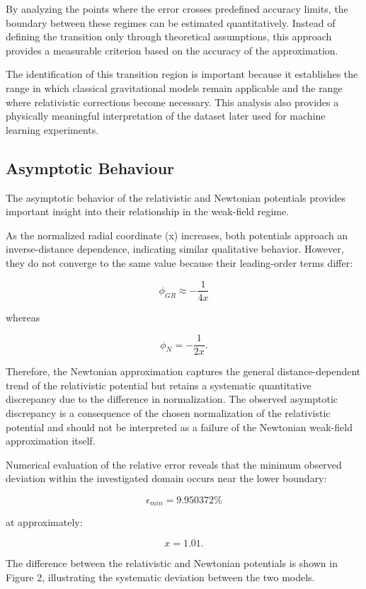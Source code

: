 \documentclass[
]{article}
\begin{document}
By analyzing the points where the error crosses predefined accuracy
limits, the boundary between these regimes can be estimated
quantitatively. Instead of defining the transition only through
theoretical assumptions, this approach provides a measurable criterion
based on the accuracy of the approximation.

The identification of this transition region is important because it
establishes the range in which classical gravitational models remain
applicable and the range where relativistic corrections become
necessary. This analysis also provides a physically meaningful
interpretation of the dataset later used for machine learning
experiments.

\subsection{Asymptotic Behaviour}\label{asymptotic-behaviour}

The asymptotic behavior of the relativistic and Newtonian potentials
provides important insight into their relationship in the weak-field
regime.

As the normalized radial coordinate (x) increases, both potentials
approach an inverse-distance dependence, indicating similar qualitative
behavior. However, they do not converge to the same value because their
leading-order terms differ:

\[
\phi_{GR}\approx-\frac{1}{4x}
\]

whereas

\[
\phi_N=-\frac{1}{2x}.
\]

Therefore, the Newtonian approximation captures the general
distance-dependent trend of the relativistic potential but retains a
systematic quantitative discrepancy due to the difference in
normalization.
The observed asymptotic discrepancy is a consequence of the chosen
normalization of the relativistic potential and should not be interpreted
as a failure of the Newtonian weak-field approximation itself.

Numerical evaluation of the relative error reveals that the minimum
observed deviation within the investigated domain occurs near the lower
boundary:

\[
\epsilon_{min}=9.950372\%
\]

at approximately:

\[
x=1.01.
\]

The difference between the relativistic and Newtonian potentials is
shown in Figure 2, illustrating the systematic deviation between the two
models.
\end{document}
